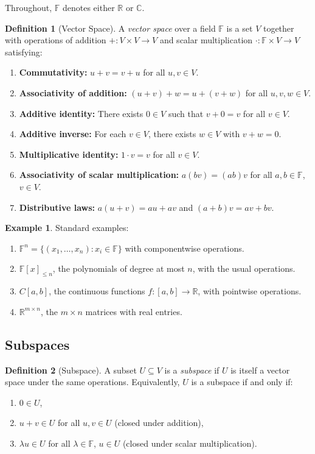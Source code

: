 \documentclass[11pt,a4paper]{article}
\theoremstyle{definition}
\newtheorem{definition}{Definition}[section]
\newtheorem{example}{Example}[section]
\theoremstyle{plain}
\theoremstyle{remark}
\newcommand{\R}{\mathbb{R}}
\newcommand{\C}{\mathbb{C}}
\newcommand{\F}{\mathbb{F}}
\begin{document}
Throughout, $\F$ denotes either $\R$ or $\C$.

\begin{definition}[Vector Space]
\label{def:vector_space}
A \emph{vector space} over a field $\F$ is a set $V$ together with operations
of addition $+: V \times V \to V$ and scalar multiplication $\cdot: \F \times V \to V$
satisfying:
\begin{enumerate}[nosep]
    \item \textbf{Commutativity:} $u + v = v + u$ for all $u, v \in V$.
    \item \textbf{Associativity of addition:} $(u + v) + w = u + (v + w)$ for all $u, v, w \in V$.
    \item \textbf{Additive identity:} There exists $0 \in V$ such that $v + 0 = v$ for all $v \in V$.
    \item \textbf{Additive inverse:} For each $v \in V$, there exists $w \in V$ with $v + w = 0$.
    \item \textbf{Multiplicative identity:} $1 \cdot v = v$ for all $v \in V$.
    \item \textbf{Associativity of scalar multiplication:} $a(bv) = (ab)v$ for all $a, b \in \F$, $v \in V$.
    \item \textbf{Distributive laws:} $a(u + v) = au + av$ and $(a + b)v = av + bv$.
\end{enumerate}
\end{definition}

\begin{example}
\label{ex:vector_spaces}
Standard examples:
\begin{enumerate}[nosep]
    \item $\F^n = \{(x_1, \ldots, x_n) : x_i \in \F\}$ with componentwise operations.
    \item $\F[x]_{\le n}$, the polynomials of degree at most $n$, with the usual operations.
    \item $C[a,b]$, the continuous functions $f: [a,b] \to \R$, with pointwise operations.
    \item $\R^{m \times n}$, the $m \times n$ matrices with real entries.
\end{enumerate}
\end{example}

\subsection{Subspaces}
\label{subsec:subspaces}

\begin{definition}[Subspace]
\label{def:subspace}
A subset $U \subseteq V$ is a \emph{subspace} if $U$ is itself a vector space under
the same operations. Equivalently, $U$ is a subspace if and only if:
\begin{enumerate}[nosep]
    \item $0 \in U$,
    \item $u + v \in U$ for all $u, v \in U$ (closed under addition),
    \item $\lambda u \in U$ for all $\lambda \in \F$, $u \in U$ (closed under scalar multiplication).
\end{enumerate}
\end{definition}
\end{document}
